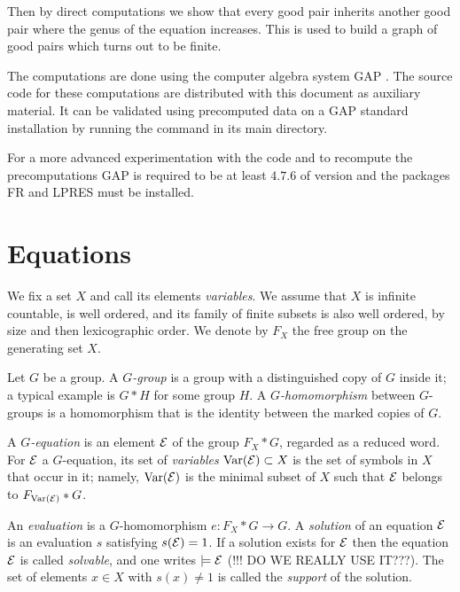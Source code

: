 \documentclass[a4paper,11pt]{amsart}
\begin{document}
Then by direct computations we show that every good pair inherits
another good pair where the genus of the equation increases.
This is used to build a graph of good pairs which turns out 
to be finite. 

The computations are done
 using the computer algebra system GAP \cite{GAP4}. The source
code for these computations are distributed with this document as
auxiliary material. It can be validated using precomputed data on a
GAP standard installation by running the command  in its main directory.

For a more advanced experimentation with the code and to recompute 
the precomputations GAP is required to be at least $4.7.6$  of version 
and the packages FR\cite{FR2.3.6} and 
LPRES\cite{LPRES0.3.0} must be installed.

\section{Equations}
We fix a set $X$ and call its elements \emph{variables}.  We assume
that $X$ is infinite countable, is well ordered, and its family of finite
subsets is also well ordered, by size and then lexicographic order. We
denote by $F_X$ the free group on the generating set $X$.

\begin{defi}
  Let $G$ be a group. A \emph{$G$-group} is a group with a
  distinguished copy of $G$ inside it; a typical example is 
  $G*H$ for some group $H$. A \emph{$G$-homomorphism} 
  between $G$-groups is a homomorphism
  that is the identity between the marked copies of $G$.

  A \emph{$G$-equation} is an element $\mathcal{E}$ of the group $F_X * G$,
  regarded as a reduced word. For $\mathcal{E}$ a $G$-equation, its set of
  \emph{variables} $\textup{Var}(\mathcal{E})\subset X$ is the set of symbols in $X$
  that occur in it; namely, $\textup{Var}(\mathcal{E})$ is the minimal subset of $X$
  such that $\mathcal{E}$ belongs to $F_{\textup{Var}(\mathcal{E})}*G$.

  An \emph{evaluation} is a $G$-homomorphism $e\colon F_X * G \to G$.
  A \emph{solution} of an equation $\mathcal{E}$ is an evaluation $s$
  satisfying $s(\mathcal{E})=1$. If a solution exists for $\mathcal{E}$ then the
  equation $\mathcal{E}$ is called \emph{solvable}, and one writes
  $\models \mathcal{E}$ (!!! DO WE REALLY USE IT???).  The set of elements $x\in X$ with $s(x)\neq 1$ is
  called the \emph{support} of the solution.
\end{defi}
\end{document}
